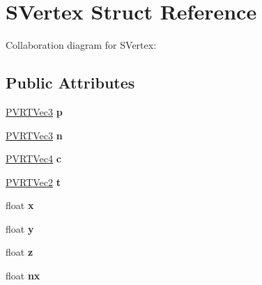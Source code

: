 \hypertarget{struct_s_vertex}{\section{S\+Vertex Struct Reference}
\label{struct_s_vertex}
}


Collaboration diagram for S\+Vertex\+:
\subsection*{Public Attributes}
\begin{DoxyCompactItemize}
\item 
\hypertarget{struct_s_vertex_ad3275f3361b6f3c0a2a3ab9c9fca9d3b}{\hyperlink{struct_p_v_r_t_vec3}{P\+V\+R\+T\+Vec3} {\bfseries p}}\label{struct_s_vertex_ad3275f3361b6f3c0a2a3ab9c9fca9d3b}

\item 
\hypertarget{struct_s_vertex_a97e8116579c15d94e7bdec96ca2071ed}{\hyperlink{struct_p_v_r_t_vec3}{P\+V\+R\+T\+Vec3} {\bfseries n}}\label{struct_s_vertex_a97e8116579c15d94e7bdec96ca2071ed}

\item 
\hypertarget{struct_s_vertex_afd4f140643c03dbfb683f43cbdbc783b}{\hyperlink{struct_p_v_r_t_vec4}{P\+V\+R\+T\+Vec4} {\bfseries c}}\label{struct_s_vertex_afd4f140643c03dbfb683f43cbdbc783b}

\item 
\hypertarget{struct_s_vertex_abbb3ddc68d9f09e25d29e63e3557aab7}{\hyperlink{struct_p_v_r_t_vec2}{P\+V\+R\+T\+Vec2} {\bfseries t}}\label{struct_s_vertex_abbb3ddc68d9f09e25d29e63e3557aab7}

\item 
\hypertarget{struct_s_vertex_a5f1f1d9f65da1828f1f5228f036a1e7b}{float {\bfseries x}}\label{struct_s_vertex_a5f1f1d9f65da1828f1f5228f036a1e7b}

\item 
\hypertarget{struct_s_vertex_a032f82bfe624055abca2c89f7f073080}{float {\bfseries y}}\label{struct_s_vertex_a032f82bfe624055abca2c89f7f073080}

\item 
\hypertarget{struct_s_vertex_a4dfd442f1ed851ec26db9822b2e6652a}{float {\bfseries z}}\label{struct_s_vertex_a4dfd442f1ed851ec26db9822b2e6652a}

\item 
\hypertarget{struct_s_vertex_a79a634d308bde1dcdb629ec3675feae6}{float {\bfseries nx}}\label{struct_s_vertex_a79a634d308bde1dcdb629ec3675feae6}


\end{DoxyCompactItemize}
